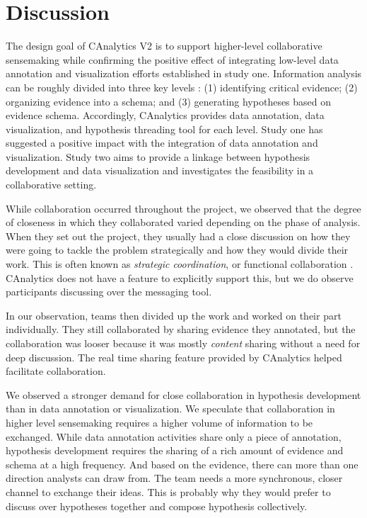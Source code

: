 \section{Discussion}

The design goal of CAnalytics V2 is to support higher-level collaborative sensemaking while confirming the positive effect of integrating low-level data annotation and visualization efforts established in study one. Information analysis can be roughly divided into three key levels \citep{Pirolli2005,Kang2014a}: (1) identifying critical evidence; (2) organizing evidence into a schema; and (3) generating hypotheses based on evidence schema. Accordingly, CAnalytics provides data annotation, data visualization, and hypothesis threading tool for each level. Study one has suggested a positive impact with the integration of data annotation and visualization. Study two aims to provide a linkage between hypothesis development and data visualization and investigates the feasibility in a collaborative setting.

While collaboration occurred throughout the project, we observed that the degree of closeness in which they collaborated varied depending on the phase of analysis. When they set out the project, they usually had a close discussion on how they were going to tackle the problem strategically and how they would divide their work. This is often known as \emph{strategic coordination}, or functional collaboration \citep{Kang2011}. CAnalytics does not have a feature to explicitly support this, but we do observe participants discussing over the messaging tool. 

In our observation, teams then divided up the work and worked on their part individually. They still collaborated by sharing evidence they annotated, but the collaboration was looser because it was mostly \emph{content} sharing without a need for deep discussion. The real time sharing feature provided by CAnalytics helped facilitate collaboration. 

We observed a stronger demand for close collaboration in hypothesis development than in data annotation or visualization. We speculate that collaboration in higher level sensemaking requires a higher volume of information to be exchanged. While data annotation activities share only a piece of annotation, hypothesis development requires the sharing of a rich amount of evidence and schema at a high frequency. And based on the evidence, there can more than one direction analysts can draw from. The team needs a more synchronous, closer channel to exchange their ideas. This is probably why they would prefer to discuss over hypotheses together and compose hypothesis collectively.

